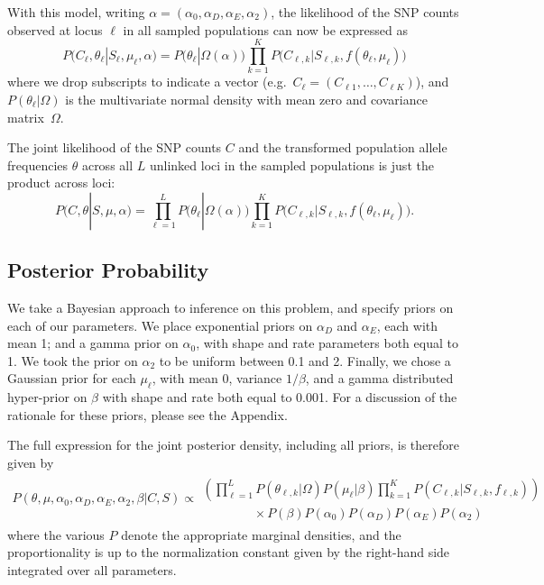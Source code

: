 With this model, 
writing $\alpha = (\alpha_{0},\alpha_{D},\alpha_{E},\alpha_{2})$,
the likelihood of the SNP counts observed at locus $\ell$ in all sampled populations can now be expressed as 
\begin{equation}
P \big( C_{\ell},\theta_{\ell}|S_{\ell},\mu_{\ell},\alpha \big) = P \big (\theta_{\ell}|\Omega(\alpha) \big) \prod_{k=1}^K P\big( C_{\ell,k}|S_{\ell,k},f(\theta_{\ell},\mu_{\ell}) \big )
\end{equation}
where 
we drop subscripts to indicate a vector (e.g.\ $C_\ell = (C_{\ell 1}, \ldots, C_{\ell K})$), 
and $P(\theta_{\ell}|\Omega)$ is the multivariate normal density with mean zero and covariance matrix~$\Omega$.

The joint likelihood of the SNP counts $C$ and the transformed population allele frequencies $\theta$ across all $L$ unlinked loci in the sampled populations is just the product across loci:
\begin{equation}
P \big( C,\theta|S,\mu,\alpha \big) =  \prod_{\ell=1}^L  P \big(\theta_{\ell}|\Omega(\alpha) \big) \prod_{k=1}^K P \big( C_{\ell,k}|S_{\ell,k},f(\theta_{\ell},\mu_{\ell}) \big) .
\end{equation}

\subsection*{Posterior Probability}
We take a Bayesian approach to inference on this problem, and specify priors on each of our parameters.  
We place exponential priors on $\alpha_D$ and $\alpha_E$, each with mean 1; and a gamma prior on $\alpha_0$, with shape and rate parameters both equal to 1.
We took the prior on $\alpha_2$ to be uniform between 0.1 and 2.
Finally, we chose a Gaussian prior for each $\mu_\ell$, with mean $0$, variance $1/\beta$, and a gamma distributed hyper-prior on $\beta$ with shape and rate both equal to 0.001.
For a discussion of the rationale for these priors, please see the Appendix.

The full expression for the joint posterior density, including all priors, is therefore given by 
\begin{align} \label{eqn:posterior_density}
  P(\theta,\mu,\alpha_{0},\alpha_{D},\alpha_{E},\alpha_{2},\beta|C, S) \propto \begin{split}
    \left( \prod_{\ell=1}^{L} P(\theta_{\ell,k}|\Omega)P(\mu_{\ell}|\beta )  \prod_{k=1}^K P(C_{\ell,k}|S_{\ell,k},f_{\ell,k}) \right) \\
 \qquad \qquad \times P(\beta)P(\alpha_{0})P(\alpha_{D})P(\alpha_{E})P(\alpha_{2})
 \end{split}
\end{align}
where the various $P$ denote the appropriate marginal densities, 
and the proportionality is up to the normalization constant given by the right-hand side integrated over all parameters.  

